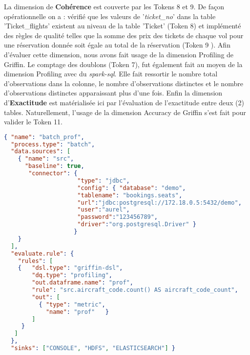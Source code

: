 La dimension de \textbf{Coh\'erence} est couverte par les Tokens 8 et 9. De façon opérationnelle on a : v\'erifi\'e que les valeurs de '\textit{ticket\_no}' dans la table 'Ticket\_flights' existent au niveau de la table 'Ticket' (Token 8)  et impl\'ement\'e des règles de qualit\'e telles que la somme des prix des tickets de chaque vol pour une r\'eservation donn\'ee soit \'egale au total de la r\'eservation (Token 9 ). Afin d'\'evaluer cette dimension, nous avons fait usage de la dimension Profiling de Griffin. Le comptage des doublons (Token 7), fut \'egalement fait au moyen de la dimension Profiling avec du \emph{spark-sql}. Elle fait ressortir le nombre total d’observations dans la colonne, le nombre d’observations distinctes et le nombre d’observations distinctes apparaissant plus d’une fois. Enfin la dimension d'\textbf{Exactitude} est mat\'erialis\'ee ici par l'\'evaluation de l'exactitude entre deux (2) tables. Naturellement, l'usage de la dimension Accuracy de Griffin s'est fait pour valider le Token 11.
\vspace{0.5cm} 
\begin{lstlisting}[language=json,firstnumber=1,caption={Exemple fichier .json : Profiling Seats},captionpos=b]
{ "name": "batch_prof",
  "process.type": "batch",
  "data.sources": [
    { "name": "src",
      "baseline": true,
       "connector": {
                     "type": "jdbc",
                     "config": { "database": "demo",
                     "tablename": "bookings.seats",
                     "url":"jdbc:postgresql://172.18.0.5:5432/demo",
                     "user":"aurel",
                     "password":"123456789",
                     "driver":"org.postgresql.Driver" }
                    }
    }   
  ],
  "evaluate.rule": {
    "rules": [
    {   "dsl.type": "griffin-dsl",
        "dq.type": "profiling",
        "out.dataframe.name": "prof",
        "rule": "src.aircraft_code.count() AS aircraft_code_count",
        "out": [
          { "type": "metric",
            "name": "prof"   }
        ]
     }
   ]
  },
  "sinks": ["CONSOLE", "HDFS", "ELASTICSEARCH"] }
\end{lstlisting}
\vspace{0.15cm}

